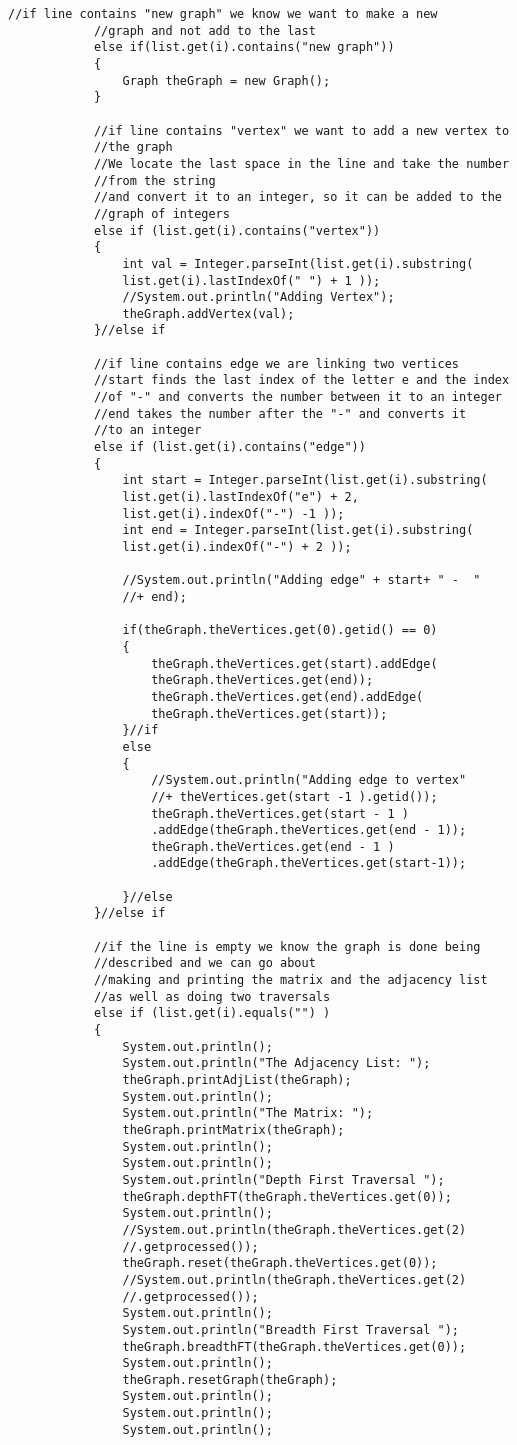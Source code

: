 \documentclass{article}
\begin{document}
\begin{lstlisting}[frame =single,
backgroundcolor = \color{grey!12}]
			//if line contains "new graph" we know we want to make a new
			//graph and not add to the last
			else if(list.get(i).contains("new graph"))
			{
				Graph theGraph = new Graph();
			}
			
			//if line contains "vertex" we want to add a new vertex to 
			//the graph
			//We locate the last space in the line and take the number
			//from the string
			//and convert it to an integer, so it can be added to the
			//graph of integers
			else if (list.get(i).contains("vertex"))
			{
				int val = Integer.parseInt(list.get(i).substring(
				list.get(i).lastIndexOf(" ") + 1 ));
				//System.out.println("Adding Vertex");
				theGraph.addVertex(val);
			}//else if
			
			//if line contains edge we are linking two vertices
			//start finds the last index of the letter e and the index 
			//of "-" and converts the number between it to an integer
			//end takes the number after the "-" and converts it
			//to an integer 
			else if (list.get(i).contains("edge"))
			{
				int start = Integer.parseInt(list.get(i).substring(
				list.get(i).lastIndexOf("e") + 2, 
				list.get(i).indexOf("-") -1 ));
				int end = Integer.parseInt(list.get(i).substring(
				list.get(i).indexOf("-") + 2 ));
				
				//System.out.println("Adding edge" + start+ " -  " 
				//+ end);
				
				if(theGraph.theVertices.get(0).getid() == 0)
				{
					theGraph.theVertices.get(start).addEdge(
					theGraph.theVertices.get(end));
					theGraph.theVertices.get(end).addEdge(
					theGraph.theVertices.get(start));
				}//if
				else
				{
					//System.out.println("Adding edge to vertex" 
					//+ theVertices.get(start -1 ).getid());
					theGraph.theVertices.get(start - 1 )
					.addEdge(theGraph.theVertices.get(end - 1));
					theGraph.theVertices.get(end - 1 )
					.addEdge(theGraph.theVertices.get(start-1));

				}//else
			}//else if
			
			//if the line is empty we know the graph is done being 
			//described and we can go about 
			//making and printing the matrix and the adjacency list
			//as well as doing two traversals 
			else if (list.get(i).equals("") )
			{
				System.out.println();
				System.out.println("The Adjacency List: ");
				theGraph.printAdjList(theGraph);
				System.out.println();
				System.out.println("The Matrix: ");
				theGraph.printMatrix(theGraph);
				System.out.println();
				System.out.println();
				System.out.println("Depth First Traversal ");
				theGraph.depthFT(theGraph.theVertices.get(0));
				System.out.println();
				//System.out.println(theGraph.theVertices.get(2)
				//.getprocessed());
				theGraph.reset(theGraph.theVertices.get(0));
				//System.out.println(theGraph.theVertices.get(2)
				//.getprocessed());
				System.out.println();
				System.out.println("Breadth First Traversal ");
				theGraph.breadthFT(theGraph.theVertices.get(0));
				System.out.println();
				theGraph.resetGraph(theGraph);
				System.out.println();
				System.out.println();
				System.out.println();
				

\end{lstlisting}
\end{document}
